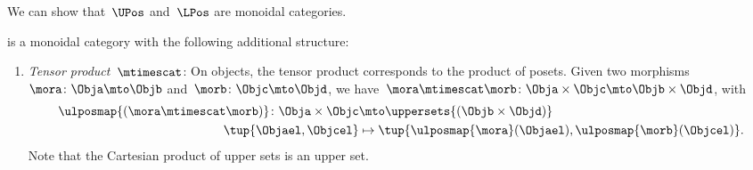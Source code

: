 We can show that~$\UPos$ and~$\LPos$ are monoidal categories.


\begin{lemma}
\label{lem:upos_moncat}
\UPos is a monoidal category with the following additional structure:
\begin{enumerate}
    \item \emph{Tensor product~$\mtimescat$}: On objects, the tensor product corresponds to the product of posets.
    Given two morphisms~$\mora\colon \Obja\mto \Objb$ and~$\morb\colon \Objc\mto \Objd$, we have~$\mora \mtimescat \morb\colon  \Obja \times \Objc \mto \Objb\times \Objd$, with
    \begin{equation}
    \begin{aligned}
       \ulposmap{(\mora\mtimescat \morb)}\colon \Obja \times \Objc &\mto \uppersets{(\Objb\times \Objd)}\\
        \tup{\Objael,\Objcel}&\mapsto \tup{\ulposmap{\mora}(\Objael), \ulposmap{\morb}(\Objcel)}.
    \end{aligned}
    \end{equation}
    Note that the Cartesian product of upper sets is an upper set.


\end{enumerate}
\end{lemma}
